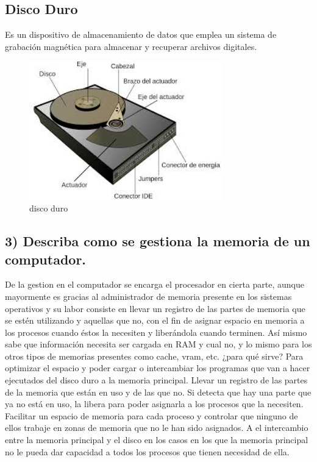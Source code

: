 \documentclass{article}
\begin{document}
\subsection*{Disco Duro}
Es un dispositivo de almacenamiento de datos que emplea un sistema de grabación magnética para almacenar y recuperar archivos digitales.
\begin{figure}[h]
    \centering
    \includegraphics[width=0.75\textwidth]{disco.jpg}
    \caption{disco duro}
    \label{fig:my_label}
\end{figure}
\subsection*{3) Describa como se gestiona la memoria de un computador.}
De la gestion en el computador se encarga el procesador en cierta parte, aunque mayormente es gracias al administrador de memoria presente en los sistemas operativos y su labor consiste en llevar un registro de las partes de memoria que se estén utilizando y aquellas que no, con el fin de asignar espacio en memoria a los procesos cuando éstos la necesiten y liberándola cuando terminen. Así mismo sabe que información necesita ser cargada en RAM y cual no, y lo mismo para los otros tipos de memorias presentes como cache, vram, etc.
¿para qué sirve?
Para optimizar el espacio y poder cargar o intercambiar los programas que van a hacer ejecutados del disco duro a la memoria principal. Llevar un registro de las partes de la memoria que están en uso y de las que no. Si detecta que hay una parte que ya no está en uso, la libera para poder asignarla a los procesos que la necesiten. Facilitar un espacio de memoria para cada proceso y controlar que ninguno de ellos trabaje en zonas de memoria que no le han sido asignados. A el intercambio entre la memoria principal y el disco en los casos en los que la memoria principal no le pueda dar capacidad a todos los procesos que tienen necesidad de ella.\\[0.1cm]
\end{document}
